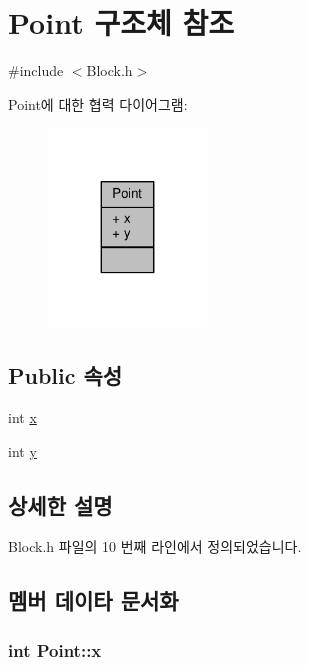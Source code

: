 \hypertarget{struct_point}{}\section{Point 구조체 참조}
\label{struct_point}


{\ttfamily \#include $<$Block.\+h$>$}



Point에 대한 협력 다이어그램\+:
\nopagebreak
\begin{figure}[H]
\begin{center}
\leavevmode
\includegraphics[width=119pt]{struct_point__coll__graph}
\end{center}
\end{figure}
\subsection*{Public 속성}
\begin{DoxyCompactItemize}
\item 
int \hyperlink{struct_point_a8c779e11e694b20e0946105a9f5de842}{x}
\item 
int \hyperlink{struct_point_a2e1b5fb2b2a83571f5c0bc0f66a73cf7}{y}
\end{DoxyCompactItemize}


\subsection{상세한 설명}


Block.\+h 파일의 10 번째 라인에서 정의되었습니다.



\subsection{멤버 데이타 문서화}
\subsubsection[{\texorpdfstring{x}{x}}]{\setlength{\rightskip}{0pt plus 5cm}int Point\+::x}\hypertarget{struct_point_a8c779e11e694b20e0946105a9f5de842}{}\label{struct_point_a8c779e11e694b20e0946105a9f5de842}


